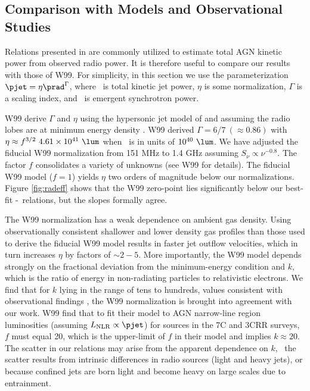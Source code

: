 \documentclass{emulateapj}
\begin{document}
\subsection{Comparison with Models and Observational Studies}
\label{sec:models}

Relations presented in \citet[][hereafter W99]{w99} are commonly
utilized to estimate total AGN kinetic power from observed radio
power. It is therefore useful to compare our results with those of
W99. For simplicity, in this section we use the parameterization
$\pjet = \eta \prad^{\Gamma}$, where \pjet\ is total kinetic jet
power, $\eta$ is some normalization, $\Gamma$ is a scaling index, and
\prad\ is emergent synchrotron power.

W99 derive $\Gamma$ and $\eta$ using the hypersonic jet model of
\citet{1991MNRAS.250..581F} and assuming the radio lobes are at
minimum energy density \citep[see][for
  details]{1980ARA&A..18..165M}. W99 derived $\Gamma = 6/7 ~(\approx
0.86)$ with $\eta \approx f^{3/2}~4.61 \times 10^{41} ~\lum$ when
\prad\ is in units of $10^{40} ~\lum$. We have adjusted the fiducial
W99 normalization from 151 MHz to 1.4 GHz assuming $S_{\nu} \propto
\nu^{-0.8}$. The factor $f$ consolidates a variety of unknowns (see
W99 for details). The fiducial W99 model ($f=1$) yields $\eta$ two
orders of magnitude below our normalizations. Figure \ref{fig:radeff}
shows that the W99 zero-point lies significantly below our best-fit
\pjet-\prad\ relations, but the slopes formally agree.

The W99 normalization has a weak dependence on ambient gas density.
Using observationally consistent shallower and lower density gas
profiles than those used to derive the fiducial W99 model results in
faster jet outflow velocities, which in turn increases $\eta$ by
factors of $\sim 2-5$. More importantly, the W99 model depends
strongly on the fractional deviation from the minimum-energy condition
and $k$, which is the ratio of energy in non-radiating particles to
relativistic electrons. We find that for $k$ lying in the range of
tens to hundreds, values consistent with observational findings
\citep{2005MNRAS.364.1343D, 2006MNRAS.372.1741D, 2006ApJ...648..200D,
  birzan08}, the W99 normalization is brought into agreement with our
work. W99 find that to fit their model to AGN narrow-line region
luminosities (assuming $L_{\mathrm{NLR}} \propto \pjet$) for sources
in the 7C and 3CRR surveys, $f$ must equal 20, which is the
upper-limit of $f$ in their model and implies $k \approx 20$. The
scatter in our relations may arise from the apparent dependence on
$k$, \ie\ the scatter results from intrinsic differences in radio
sources (light and heavy jets), or because confined jets are born
light and become heavy on large scales due to entrainment.
\end{document}
